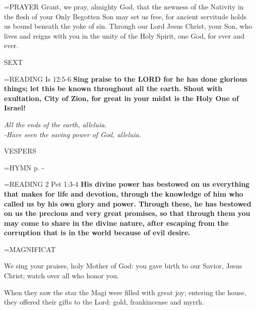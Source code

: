 \hangindent=\parindent \small{PRAYER 	Grant, we pray, almighty God, that the newness of the Nativity in the flesh of your Only Begotten Son may set us free, for ancient servitude holds us bound beneath the yoke of sin. Through our Lord Jesus Christ, your Son, who lives and reigns with you in the unity of the Holy Spirit, one God, for ever and ever.}

\begin{flushleft}\normalsize SEXT\\\end{flushleft}

\hangindent=\parindent \small{\uppercase{READING}}    Is 12:5-6 \textbf{   Sing praise to the LORD for he has done glorious things; let this be known throughout all the earth. Shout with exultation, City of Zion, for great in your midst is the Holy One of Israel!\\}

\begin{center}
\textit{All the ends of the earth, alleluia.\\
-Have seen the saving power of God, alleluia.}
\end{center}

\begin{flushleft}\normalsize VESPERS\\\end{flushleft}

\hangindent=\parindent \small{\uppercase{HYMN} p. \pageref{christmas:firstHymn}-\pageref{christmas:lastHymn}\\}

\hangindent=\parindent \small{\uppercase{READING}}    2 Pet 1:3-4 \textbf{   His divine power has bestowed on us everything that makes for life and devotion, through the knowledge of him who called us by his own glory and power. Through these, he has bestowed on us the precious and very great promises, so that through them you may come to share in the divine nature, after escaping from the corruption that is in the world because of evil desire.\\}

\hangindent=\parindent \small MAGNIFICAT 
\begin{description}[labelindent=\parindent, leftmargin=*]
\item [(before the Epiphany):]  We sing your praises, holy Mother of God: you gave birth to our Savior, Jesus Christ; watch over all who honor you.
\item [(Monday after the Epiphany):]  When they saw the star the Magi were filled with great joy; entering the house, they offered their gifts to the Lord: gold, frankincense and myrrh.
\end{description}

